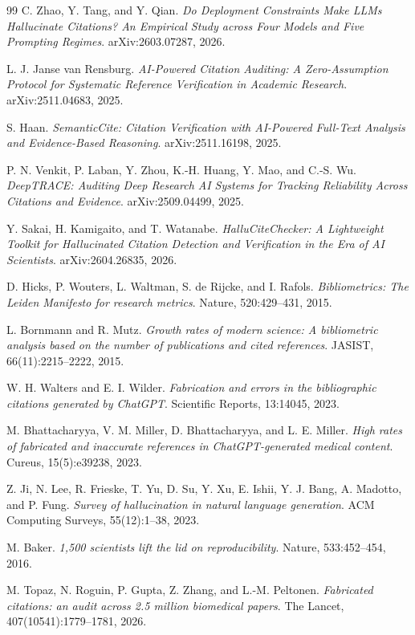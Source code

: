 \documentclass{article}
\begin{document}
{\begin{thebibliography}{99}
C. Zhao, Y. Tang, and Y. Qian.
\textit{Do Deployment Constraints Make LLMs Hallucinate Citations? An Empirical Study across Four Models and Five Prompting Regimes}.
arXiv:2603.07287, 2026.

L. J. Janse van Rensburg.
\textit{AI-Powered Citation Auditing: A Zero-Assumption Protocol for Systematic Reference Verification in Academic Research}.
arXiv:2511.04683, 2025.

S. Haan.
\textit{SemanticCite: Citation Verification with AI-Powered Full-Text Analysis and Evidence-Based Reasoning}.
arXiv:2511.16198, 2025.

P. N. Venkit, P. Laban, Y. Zhou, K.-H. Huang, Y. Mao, and C.-S. Wu.
\textit{DeepTRACE: Auditing Deep Research AI Systems for Tracking Reliability Across Citations and Evidence}.
arXiv:2509.04499, 2025.

Y. Sakai, H. Kamigaito, and T. Watanabe.
\textit{HalluCiteChecker: A Lightweight Toolkit for Hallucinated Citation Detection and Verification in the Era of AI Scientists}.
arXiv:2604.26835, 2026.

D. Hicks, P. Wouters, L. Waltman, S. de Rijcke, and I. Rafols.
\textit{Bibliometrics: The Leiden Manifesto for research metrics}.
Nature, 520:429--431, 2015.

L. Bornmann and R. Mutz.
\textit{Growth rates of modern science: A bibliometric analysis based on the number of publications and cited references}.
JASIST, 66(11):2215--2222, 2015.

W. H. Walters and E. I. Wilder.
\textit{Fabrication and errors in the bibliographic citations generated by ChatGPT}.
Scientific Reports, 13:14045, 2023.

M. Bhattacharyya, V. M. Miller, D. Bhattacharyya, and L. E. Miller.
\textit{High rates of fabricated and inaccurate references in ChatGPT-generated medical content}.
Cureus, 15(5):e39238, 2023.

Z. Ji, N. Lee, R. Frieske, T. Yu, D. Su, Y. Xu, E. Ishii, Y. J. Bang, A. Madotto, and P. Fung.
\textit{Survey of hallucination in natural language generation}.
ACM Computing Surveys, 55(12):1--38, 2023.

M. Baker.
\textit{1,500 scientists lift the lid on reproducibility}.
Nature, 533:452--454, 2016.

M. Topaz, N. Roguin, P. Gupta, Z. Zhang, and L.-M. Peltonen.
\textit{Fabricated citations: an audit across 2.5 million biomedical papers}.
The Lancet, 407(10541):1779--1781, 2026.


\end{thebibliography}}
\end{document}
